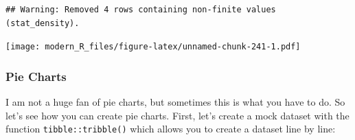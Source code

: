 \documentclass[]{gitbook}
\newenvironment{Shaded}{\begin{snugshade}}{\end{snugshade}}
\newcommand{\DataTypeTok}[1]{\textcolor[rgb]{0.13,0.29,0.53}{#1}}
\newcommand{\DecValTok}[1]{\textcolor[rgb]{0.00,0.00,0.81}{#1}}
\newcommand{\KeywordTok}[1]{\textcolor[rgb]{0.13,0.29,0.53}{\textbf{#1}}}
\newcommand{\NormalTok}[1]{#1}
\newcommand{\OperatorTok}[1]{\textcolor[rgb]{0.81,0.36,0.00}{\textbf{#1}}}
\newcommand{\StringTok}[1]{\textcolor[rgb]{0.31,0.60,0.02}{#1}}
\theoremstyle{definition}
\theoremstyle{definition}
\theoremstyle{definition}
\theoremstyle{remark}
\begin{document}
\begin{Shaded}
\end{Shaded}

\begin{verbatim}
## Warning: Removed 4 rows containing non-finite values (stat_density).
\end{verbatim}

\texttt{[image: modern\_R\_files/figure-latex/unnamed-chunk-241-1.pdf]}

\hypertarget{pie-charts}{%
\subsubsection{Pie Charts}\label{pie-charts}}

I am not a huge fan of pie charts, but sometimes this is what you have
to do. So let's see how you can create pie charts. First, let's create a
mock dataset with the function \texttt{tibble::tribble()} which allows
you to create a dataset line by line:
\end{document}
